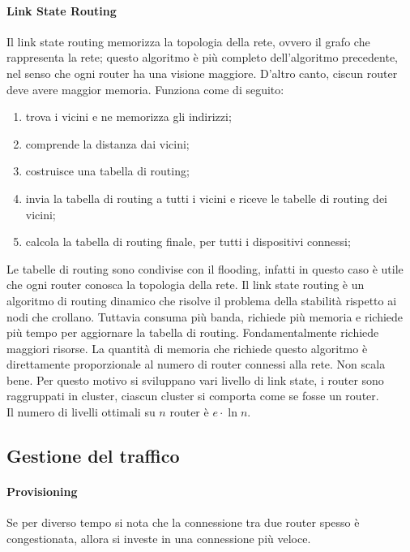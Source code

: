 \documentclass{article}
\begin{document}
\paragraph{Link State Routing}
Il link state routing memorizza la topologia della rete, ovvero il grafo che
rappresenta la rete; questo algoritmo è più completo dell'algoritmo precedente, 
nel senso che ogni router ha una visione maggiore. D'altro canto, ciscun router 
deve avere maggior memoria. Funziona come di seguito:
\begin{enumerate}
	\item trova i vicini e ne memorizza gli indirizzi;
	\item comprende la distanza dai vicini;
	\item costruisce una tabella di routing;
	\item invia la tabella di routing a tutti i vicini e riceve le tabelle di
		routing dei vicini;
	\item calcola la tabella di routing finale, per tutti i dispositivi
		connessi;
\end{enumerate}

Le tabelle di routing sono condivise con il flooding, infatti in questo caso è
utile che ogni router conosca la topologia della rete. Il link state routing è
un algoritmo di routing dinamico che risolve il problema della stabilità
rispetto ai nodi che crollano. Tuttavia consuma più banda, richiede più memoria
e richiede più tempo per aggiornare la tabella di routing. Fondamentalmente
richiede maggiori risorse. La quantità di memoria che richiede questo algoritmo
è direttamente proporzionale al numero di router connessi alla rete. Non scala
bene. Per questo motivo si sviluppano vari livello di link state, i router sono
raggruppati in cluster, ciascun cluster si comporta come se fosse un router.\\
Il numero di livelli ottimali su $n$ router è $e \cdot \ln n$.\\

\subsection{Gestione del traffico}
\paragraph{Provisioning}
Se per diverso tempo si nota che la connessione tra due router spesso è
congestionata, allora si investe in una connessione più veloce.\\
\end{document}

